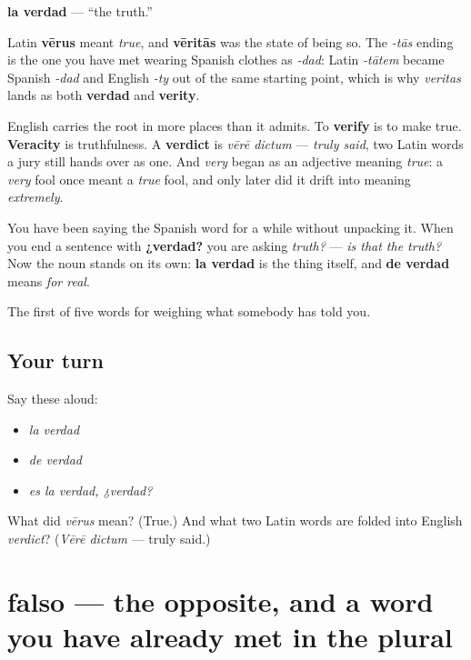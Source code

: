 \begin{cousinweb}
\textbf{la verdad} — \textquotedblleft{}the truth.\textquotedblright{}

Latin \textbf{vērus} meant \emph{true}, and \textbf{vēritās} was the state of being so. The \emph{-tās} ending is the one you have met wearing Spanish clothes as \emph{-dad}: Latin \emph{-tātem} became Spanish \emph{-dad} and English \emph{-ty} out of the same starting point, which is why \emph{veritas} lands as both \textbf{verdad} and \textbf{verity}.

English carries the root in more places than it admits. To \textbf{verify} is to make true. \textbf{Veracity} is truthfulness. A \textbf{verdict} is \emph{vērē dictum} — \emph{truly said}, two Latin words a jury still hands over as one. And \emph{very} began as an adjective meaning \emph{true}: a \emph{very} fool once meant a \emph{true} fool, and only later did it drift into meaning \emph{extremely}.

You have been saying the Spanish word for a while without unpacking it. When you end a sentence with \textbf{¿verdad?} you are asking \emph{truth?} — \emph{is that the truth?} Now the noun stands on its own: \textbf{la verdad} is the thing itself, and \textbf{de verdad} means \emph{for real}.
\end{cousinweb}

\begin{grammarlens}[title={What you've built}]
The first of five words for weighing what somebody has told you.
\end{grammarlens}

\subsection*{Your turn}
Say these aloud:

\begin{itemize}
\raggedright
  \item \emph{la verdad}
  \item \emph{de verdad}
  \item \emph{es la verdad, ¿verdad?}
\end{itemize}

\begin{tcolorbox}[breakable,colback=teal!4,colframe=teal!35!black,title={Before you move on}]
What did \emph{vērus} mean? (True.) And what two Latin words are folded into English \emph{verdict}? (\emph{Vērē dictum} — truly said.)
\end{tcolorbox}
\section[falso]{falso — the opposite, and a word you have already met in the plural}

